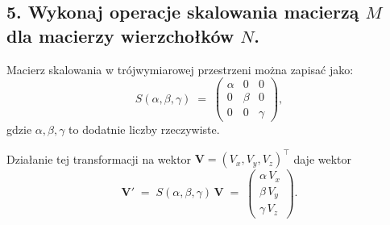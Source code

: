 \subsection*{5. Wykonaj operacje skalowania macierzą \( M \) dla macierzy wierzchołków \( N \).}


\noindent
Macierz skalowania w trójwymiarowej przestrzeni można zapisać jako:
\[
S(\alpha,\beta,\gamma) 
\;=\;
\begin{pmatrix}
\alpha & 0      & 0 \\
0      & \beta  & 0 \\
0      & 0      & \gamma
\end{pmatrix},
\]
gdzie \(\alpha,\beta,\gamma\) to dodatnie liczby rzeczywiste.

\bigskip
\noindent
Działanie tej transformacji na wektor \(\mathbf{V} = (V_x, V_y, V_z)^\top\) daje wektor
\[
\mathbf{V}' \;=\; S(\alpha,\beta,\gamma)\,\mathbf{V}
\;=\;
\begin{pmatrix}
\alpha\,V_x \\
\beta\,V_y \\
\gamma\,V_z
\end{pmatrix}.
\]


